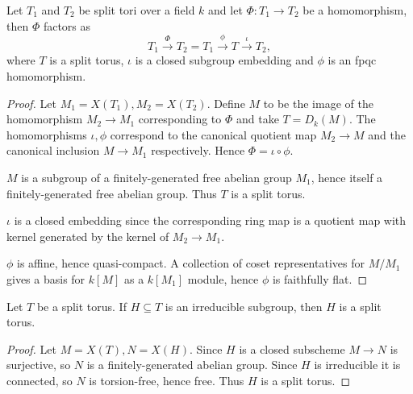 \begin{proposition}
  \label{1-1-1-group-hom-subtorus} %

  Let $T_1$ and $T_2$ be split tori over a field $k$ and let $\Phi: T_1 \to T_2$ be a homomorphism,
  then $\Phi$ factors as
  \[
    T_1 \xrightarrow{\Phi} T_2 = T_1 \xrightarrow{\phi} T \xrightarrow{\iota} T_2,
  \]
  where $T$ is a split torus, $\iota$ is a closed subgroup embedding and $\phi$ is an fpqc homomorphism.
\end{proposition}
\begin{proof}
  Let $M_1=X(T_1), M_2=X(T_2)$. Define $M$ to be the image of the homomorphism $M_2 \to M_1$
  corresponding to $\Phi$ and take $T = D_k(M)$. The homomorphisms $\iota,\phi$ correspond to the
  canonical quotient map $M_2 \to M$ and the canonical inclusion $M \to M_1$ respectively.
  Hence $\Phi = \iota\circ\phi$.

  $M$ is a subgroup of a finitely-generated free abelian group $M_1$,
  hence itself a finitely-generated free abelian group. Thus $T$ is a split torus.

  $\iota$ is a closed embedding since the corresponding ring map is a quotient map with kernel
  generated by the kernel of $M_2 \to M_1$.

  $\phi$ is affine, hence quasi-compact. A collection of coset representatives for $M /M_1$
  gives a basis for $k[M]$ as a $k[M_1]$ module, hence $\phi$ is faithfully flat.
\end{proof}


\begin{proposition}
  \label{1-1-1-subgroup-subtorus}

  Let $T$ be a split torus.
  If $H \subseteq T$ is an irreducible subgroup, then $H$ is a split torus.
\end{proposition}
\begin{proof}

  Let $M = X(T), N=X(H)$. Since $H$ is a closed subscheme $M \to N$ is surjective,
  so $N$ is a finitely-generated abelian group. Since $H$ is irreducible it is connected,
  so $N$ is torsion-free, hence free. Thus $H$ is a split torus.
\end{proof}



